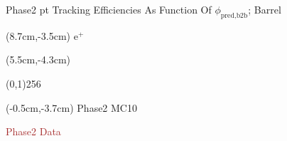 \documentclass[8pt]{beamer}
\begin{document}
\begin{frame}{Phase2 pt Tracking Efficiencies As Function Of $\phi_{\textrm{pred,b2b}}$; Barrel}
	\begin{textblock*}{2cm}(8.7cm,-3.5cm)
		$\textrm{e}^+$
	\end{textblock*}
	
	
	
	\begin{textblock*}{11cm}(5.5cm,-4.3cm)
		
		\begin{center}
			\line(0,1){256}
		\end{center}
		
	\end{textblock*}
	
	
	
	\begin{textblock*}{4cm}(-0.5cm,-3.7cm)
		\textcolor{OliveGreen}{Phase2 MC10}
		
		\textcolor{brown}{Phase2 Data}
	\end{textblock*}
	
	
	
	
\end{frame}
\end{document}
